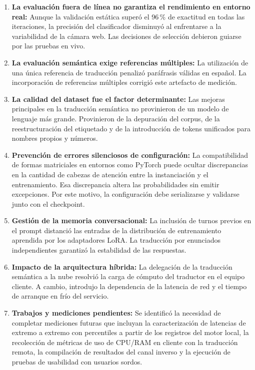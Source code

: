 \begin{enumerate}
    \item \textbf{La evaluación fuera de línea no garantiza el rendimiento en entorno real:} Aunque la validación estática superó el 96\,\% de exactitud en todas las iteraciones, la precisión del clasificador disminuyó al enfrentarse a la variabilidad de la cámara web. Las decisiones de selección debieron guiarse por las pruebas en vivo.
    \item \textbf{La evaluación semántica exige referencias múltiples:} La utilización de una única referencia de traducción penalizó paráfrasis válidas en español. La incorporación de referencias múltiples corrigió este artefacto de medición.
    \item \textbf{La calidad del dataset fue el factor determinante:} Las mejoras principales en la traducción semántica no provinieron de un modelo de lenguaje más grande. Provinieron de la depuración del corpus, de la reestructuración del etiquetado y de la introducción de tokens unificados para nombres propios y números.
    \item \textbf{Prevención de errores silenciosos de configuración:} La compatibilidad de formas matriciales en entornos como PyTorch puede ocultar discrepancias en la cantidad de cabezas de atención entre la instanciación y el entrenamiento. Esa discrepancia altera las probabilidades sin emitir excepciones. Por este motivo, la configuración debe serializarse y validarse junto con el checkpoint.
    \item \textbf{Gestión de la memoria conversacional:} La inclusión de turnos previos en el prompt distanció las entradas de la distribución de entrenamiento aprendida por los adaptadores LoRA. La traducción por enunciados independientes garantizó la estabilidad de las respuestas.
    \item \textbf{Impacto de la arquitectura híbrida:} La delegación de la traducción semántica a la nube resolvió la carga de cómputo del traductor en el equipo cliente. A cambio, introdujo la dependencia de la latencia de red y el tiempo de arranque en frío del servicio.
    \item \textbf{Trabajos y mediciones pendientes:} Se identificó la necesidad de completar mediciones futuras que incluyan la caracterización de latencias de extremo a extremo con percentiles a partir de los registros del motor local, la recolección de métricas de uso de CPU/RAM en cliente con la traducción remota, la compilación de resultados del canal inverso y la ejecución de pruebas de usabilidad con usuarios sordos.
\end{enumerate}